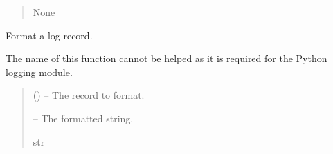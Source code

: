 \documentclass[letterpaper,11pt,english]{sphinxmanual}
\begin{document}
\begin{savenotes}
\begin{fulllineitems}
\begin{savenotes}
\begin{fulllineitems}
\begin{quote}
\begin{description}
\sphinxAtStartPar
None

\end{description}\end{quote}

\end{fulllineitems}\end{savenotes}


\begin{savenotes}\begin{fulllineitems}
\label{\detokenize{code/lezargus.library.logging:lezargus.library.logging.ColoredLogFormatter.format}}
\pysigstartsignatures
{}
\pysigstopsignatures
\sphinxAtStartPar
Format a log record.

\sphinxAtStartPar
The name of this function cannot be helped as it is required for the
Python logging module.
\begin{quote}\begin{description}
\sphinxAtStartPar
{} () – The record to format.

\sphinxAtStartPar
{} – The formatted string.

\sphinxAtStartPar
str

\end{description}\end{quote}

\end{fulllineitems}\end{savenotes}


\end{fulllineitems}\end{savenotes}

\end{document}
